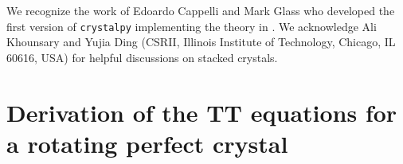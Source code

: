 \documentclass{iucr}
\begin{document}
We recognize the work of Edoardo Cappelli and Mark Glass who developed the first version of {\tt crystalpy} implementing the theory in \cite{ZachariasenBook}. We acknowledge Ali Khounsary and Yujia Ding (CSRII, Illinois Institute of Technology, Chicago, IL 60616, USA) for helpful discussions on stacked crystals. 



\appendix

\section{Derivation of the TT equations for a rotating perfect crystal}
\label{appendix:rotating}
\end{document}
